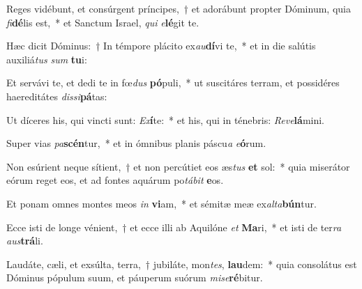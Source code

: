 \item Reges vidébunt, et consúrgent príncipes,~† et adorábunt propter Dóminum, quia \textit{fi}\textbf{dé}lis est,~* et Sanctum Israel, \textit{qui} \textit{e}\textbf{lé}git te.
\item Hæc dicit Dóminus:~† In témpore plácito ex\textit{au}\textbf{dí}vi te,~* et in die salútis auxiliá\textit{tus} \textit{sum} \textbf{tu}i:
\item Et servávi te, et dedi te in fœ\textit{dus} \textbf{pó}puli,~* ut suscitáres terram, et possidéres haereditátes \textit{dis}\textit{si}\textbf{pá}tas:
\item Ut díceres his, qui vincti sunt: \textit{Ex}\textbf{í}te:~* et his, qui in ténebris: \textit{Re}\textit{ve}\textbf{lá}mini.
\item Super vias \textit{pa}\textbf{scén}tur,~* et in ómnibus planis páscu\textit{a} \textit{e}\textbf{ó}rum.
\item Non esúrient neque sítient,~† et non percútiet eos æs\textit{tus} \textbf{et} sol:~* quia miserátor eórum reget eos, et ad fontes aquárum po\textit{tá}\textit{bit} \textbf{e}os.
\item Et ponam omnes montes meos \textit{in} \textbf{vi}am,~* et sémitæ meæ ex\textit{al}\textit{ta}\textbf{bún}tur.
\item Ecce isti de longe vénient,~† et ecce illi ab Aquilóne \textit{et} \textbf{Ma}ri,~* et isti de ter\textit{ra} \textit{aus}\textbf{trá}li.
\item Laudáte, cæli, et exsúlta, terra,~† jubiláte, mon\textit{tes}, \textbf{lau}dem:~* quia consolátus est Dóminus pópulum suum, et páuperum suórum \textit{mi}\textit{se}\textbf{ré}bitur.
